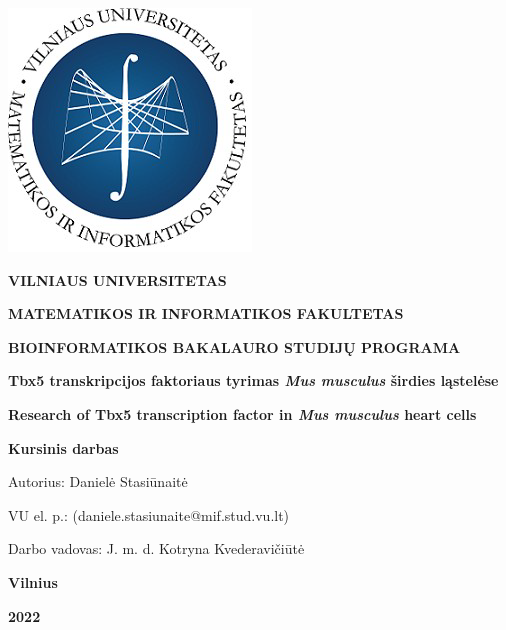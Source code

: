 \documentclass[12pt]{article}
\begin{document}

\begin{titlepage}
\vskip 20pt
\begin{center}
\includegraphics[scale=0.5]{MIF}
\end{center}


\vskip 20pt
\centerline{\bf \large \textbf{VILNIAUS UNIVERSITETAS}}
\bigskip
\centerline{\large \textbf{MATEMATIKOS IR INFORMATIKOS FAKULTETAS}}
\bigskip
\centerline{\large \textbf{BIOINFORMATIKOS BAKALAURO STUDIJŲ PROGRAMA}}

\vskip 90pt
\begin{center}
    {\bf \LARGE Tbx5 transkripcijos faktoriaus tyrimas \emph{Mus musculus}
     širdies ląstelėse}
\end{center}
\begin{center}
    {\bf \Large Research of Tbx5 transcription factor in \emph{Mus musculus}
     heart cells}
\end{center}
\vskip 20pt
\centerline{\bf \large \textbf{Kursinis darbas}}
\bigskip
\vskip 40pt

\hskip 140pt {\large Autorius: Danielė Stasiūnaitė}

\hskip 140pt{\large VU el. p.: (daniele.stasiunaite@mif.stud.vu.lt)}
\bigskip
\vskip 20pt

\hskip 140pt {\large Darbo vadovas: J. m. d. Kotryna Kvederavičiūtė}
\vskip 60pt
\vskip 40pt
\centerline{\large \textbf{Vilnius}}
\centerline{\large \textbf{2022}}
\newpage
\end{titlepage}


\tableofcontents
\newpage

\end{document}
